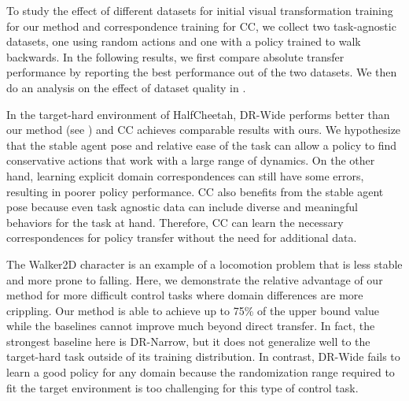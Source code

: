 To study the effect of different datasets for initial visual transformation training for our method and correspondence training for CC, we collect two task-agnostic datasets, one using random actions and one with a policy trained to walk backwards. In the following results, we first compare absolute transfer performance by reporting the best performance out of the two datasets.  We then do an analysis on the effect of dataset quality in .



In the target-hard environment of HalfCheetah, DR-Wide performs better than our method (see ) and CC achieves comparable results with ours.  We hypothesize that the stable agent pose and relative ease of the task can allow a policy to find conservative actions that work with a large range of dynamics. On the other hand, learning explicit domain correspondences can still have some errors, resulting in poorer policy performance.  CC also benefits from the stable agent pose because even task agnostic data can include diverse and meaningful behaviors for the task at hand.  Therefore, CC can learn the necessary correspondences for policy transfer without the need for additional data.

The Walker2D character is an example of a locomotion problem that is less stable and more prone to falling.  Here, we demonstrate the relative advantage of our method for more difficult control tasks where domain differences are more crippling.  Our method is able to achieve up to 75\% of the upper bound value  while the baselines cannot improve much beyond direct transfer.  In fact, the strongest baseline here is DR-Narrow, but it does not generalize well to the target-hard task outside of its training distribution.  In contrast, DR-Wide fails to learn a good policy for any domain because the randomization range required to fit the target environment is too challenging for this type of control task.



